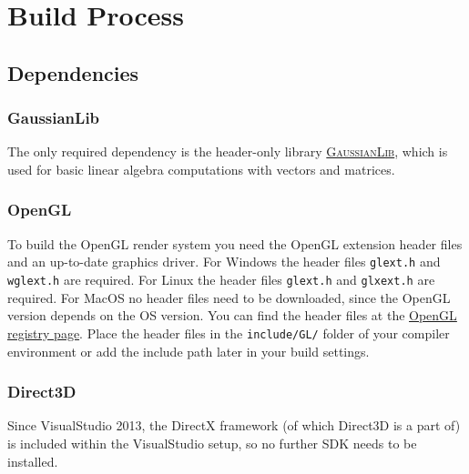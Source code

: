\documentclass{article}
\begin{document}
\newpage
\section*{Build Process}

\subsection*{Dependencies}

\subsubsection*{GaussianLib}

The only required dependency is the header-only library
\href{https://github.com/LukasBanana/GaussianLib}{\textsc{GaussianLib}},
which is used for basic linear algebra computations with vectors and matrices.

\subsubsection*{OpenGL}

To build the OpenGL render system you need the OpenGL extension header files and an up-to-date graphics driver.
For Windows the header files \texttt{glext.h} and \texttt{wglext.h} are required.
For Linux the header files \texttt{glext.h} and \texttt{glxext.h} are required.
For MacOS no header files need to be downloaded, since the OpenGL version depends on the OS version.
You can find the header files at the \href{https://www.opengl.org/registry/#headers}{OpenGL registry page}.
Place the header files in the \texttt{include/GL/} folder of your compiler environment
or add the include path later in your build settings.

\subsubsection*{Direct3D}

Since VisualStudio 2013, the DirectX framework (of which Direct3D is a part of) is included within
the VisualStudio setup, so no further SDK needs to be installed.


\end{document}
